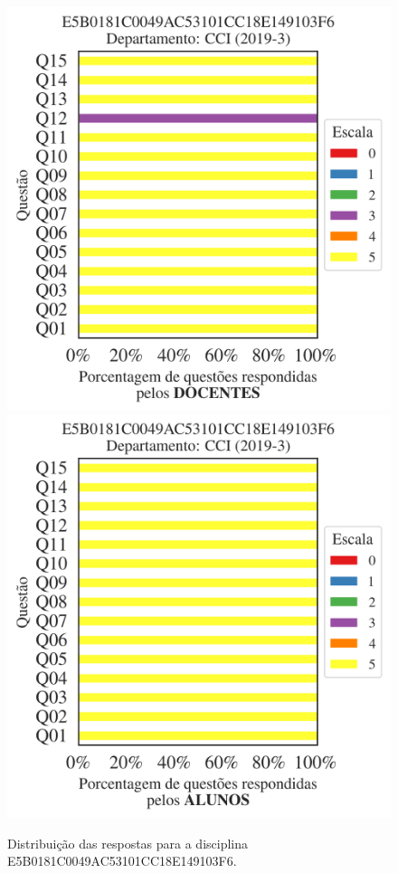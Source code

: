\documentclass[a4paper,10pt]{article}
\begin{document}
\begin{figure}[h]
\centering
\includegraphics[width=0.485\linewidth]{analise_disciplina_departamento_CCI_E5B0181C0049AC53101CC18E149103F6_docentes.png}
\includegraphics[width=0.485\linewidth]{analise_disciplina_departamento_CCI_E5B0181C0049AC53101CC18E149103F6_alunos.png}
\caption{\label{fig:analise_geral_departamento}                Distribuição das respostas para a disciplina E5B0181C0049AC53101CC18E149103F6. }
\end{figure}
\end{document}
